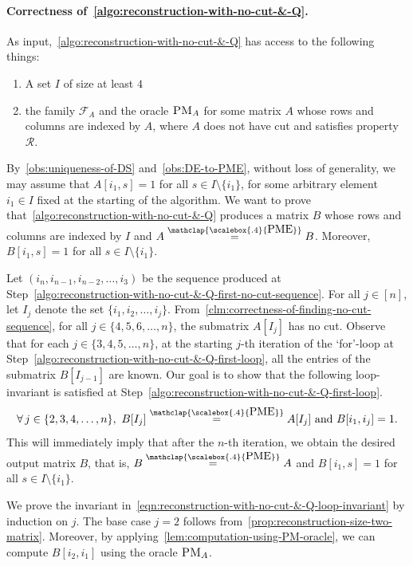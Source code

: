 \documentclass[11pt,letterpaper]{article}
\newcommand{\PME}{\stackrel{\mathclap{\scalebox{.4}{\mbox{PME}}}}{=}}
\newcommand{\prop}{\mathcal{R}}
\newcommand{\PMoracle}[1]{\textsc{PM}_{#1}}
\newcommand{\submatrixfamily}[1]{\mathcal{F}_{#1}}
\begin{document}
{{{\paragraph{Correctness of~\cref{algo:reconstruction-with-no-cut-&-Q}.}
As input,~\cref{algo:reconstruction-with-no-cut-&-Q} has access to the following things:
\begin{enumerate}
\item A set $I$ of size at least $4$
\item the family $\submatrixfamily{A}$ and the oracle $\PMoracle{A}$ for some matrix $A$ whose rows and columns are indexed by $A$, where $A$ does not have cut and satisfies property $\prop$.
\end{enumerate}
By~\cref{obs:uniqueness-of-DS} and~\cref{obs:DE-to-PME}, without loss of generality, we may assume that $A[i_1, s]=1$ for all $s\in I\setminus\{i_1\}$, for some arbitrary element $i_1\in I$ fixed at the starting of the algorithm. We want to prove that~\cref{algo:reconstruction-with-no-cut-&-Q} produces a matrix $B$ whose rows and columns are indexed by $I$ and $A\PME B$.  Moreover, $B[i_1, s]=1$ for all $s\in I\setminus\{i_1\}$.

Let $(i_n, i_{n-1}, i_{n-2},\ldots, i_3)$  be the sequence produced at Step~\ref{algo:reconstruction-with-no-cut-&-Q-first-no-cut-sequence}. For all $j\in[n]$, let $I_j$ denote the set $\{i_1, i_2, \ldots, i_j\}$. From~\cref{clm:correctness-of-finding-no-cut-sequence}, for all $j\in\{4, 5, 6, \ldots,n\}$, the submatrix $A[I_j]$ has no cut. Observe that for each $j\in\{3,4,5,\ldots, n\}$,  at the starting $j$-th iteration of the `for'-loop at Step~\ref{algo:reconstruction-with-no-cut-&-Q-first-loop}, all the entries of the submatrix $B[I_{j-1}]$ are known. Our goal is to show that the following loop-invariant is satisfied at Step~\ref{algo:reconstruction-with-no-cut-&-Q-first-loop}.  
\begin{equation}
\label{eqn:reconstruction-with-no-cut-&-Q-loop-invariant}
\forall\, j\in\{2,3,4,\ldots,n\},\ B[I_j]\PME A[I_j] \text{ and } B[i_1, i_j]=1.
\end{equation}
This will immediately imply that after the $n$-th iteration, we obtain the desired output matrix $B$, that is, $B\PME A$ and $B[i_1, s]=1$ for all $s\in I\setminus\{i_1\}$. 

We prove the invariant in~\cref{eqn:reconstruction-with-no-cut-&-Q-loop-invariant} by induction on $j$. The base case $j=2$ follows from~\cref{prop:reconstruction-size-two-matrix}. Moreover, by applying~\cref{lem:computation-using-PM-oracle}, we can compute $B[i_2, i_1]$ using the oracle $\PMoracle{A}$.

}}}
\end{document}
